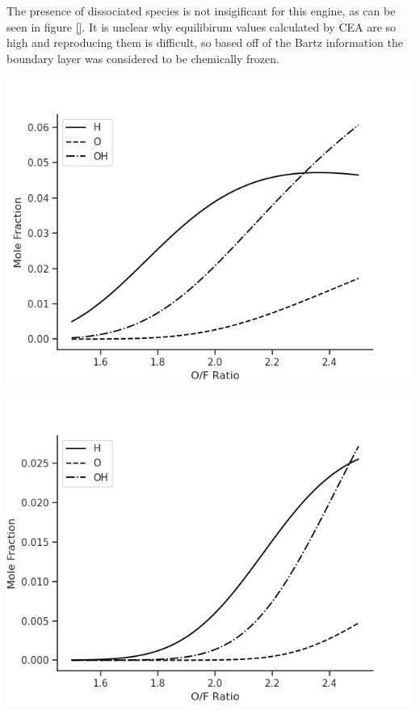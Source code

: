 \documentclass[11pt]{article}
\begin{document}
The presence of dissociated species is not insigificant for this engine, as can be seen in figure \ref{}. It is unclear why equilibirum values calculated by CEA are so high and reproducing them is difficult, so based off of the Bartz information the boundary layer was considered to be chemically frozen.


\begin{minipage}{.5\linewidth}
  \centering
  \includegraphics[width=\linewidth]{dissociated-chamber.png}
\end{minipage}%
\begin{minipage}{.5\linewidth}
  \centering
  \includegraphics[width=\linewidth]{dissociated-nozzle.png}
\end{minipage}
\end{document}
